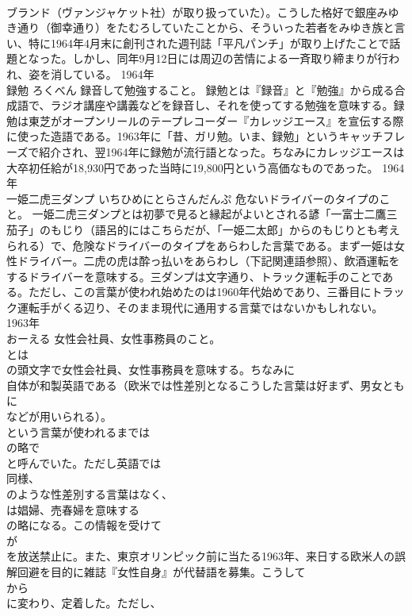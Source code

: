 \documentclass[8pt]{extreport}
\begin{document}
\begin{CJK}{UTF8}{min}
\\	ブランド（ヴァンジャケット社）が取り扱っていた）。こうした格好で銀座みゆき通り（御幸通り）をたむろしていたことから、そういった若者をみゆき族と言い、特に1964年4月末に創刊された週刊誌「平凡パンチ」が取り上げたことで話題となった。しかし、同年9月12日には周辺の苦情による一斉取り締まりが行われ、姿を消している。	1964年	
\\	録勉	ろくべん	録音して勉強すること。	録勉とは『録音』と『勉強』から成る合成語で、ラジオ講座や講義などを録音し、それを使ってする勉強を意味する。録勉は東芝がオープンリールのテープレコーダー『カレッジエース』を宣伝する際に使った造語である。1963年に「昔、ガリ勉。いま、録勉」というキャッチフレーズで紹介され、翌1964年に録勉が流行語となった。ちなみにカレッジエースは大卒初任給が18,930円であった当時に19,800円という高価なものであった。	1964年	
\\	一姫二虎三ダンプ	いちひめにとらさんだんぷ	危ないドライバーのタイプのこと。	一姫二虎三ダンプとは初夢で見ると縁起がよいとされる諺「一富士二鷹三茄子」のもじり（語呂的にはこちらだが、「一姫二太郎」からのもじりとも考えられる）で、危険なドライバーのタイプをあらわした言葉である。まず一姫は女性ドライバー。二虎の虎は酔っ払いをあらわし（下記関連語参照）、飲酒運転をするドライバーを意味する。三ダンプは文字通り、トラック運転手のことである。ただし、この言葉が使われ始めたのは1960年代始めであり、三番目にトラック運転手がくる辺り、そのまま現代に通用する言葉ではないかもしれない。	1963年	
\\	おーえる	女性会社員、女性事務員のこと。	
\\	とは
\\	の頭文字で女性会社員、女性事務員を意味する。ちなみに
\\	自体が和製英語である（欧米では性差別となるこうした言葉は好まず、男女ともに
\\	などが用いられる）。
\\	という言葉が使われるまでは
\\	の略で
\\	と呼んでいた。ただし英語では
\\	同様、
\\	のような性差別する言葉はなく、
\\	は娼婦、売春婦を意味する
\\	の略になる。この情報を受けて
\\	が
\\	を放送禁止に。また、東京オリンピック前に当たる1963年、来日する欧米人の誤解回避を目的に雑誌『女性自身』が代替語を募集。こうして
\\	から
\\	に変わり、定着した。ただし、

\end{CJK}
\end{document}
